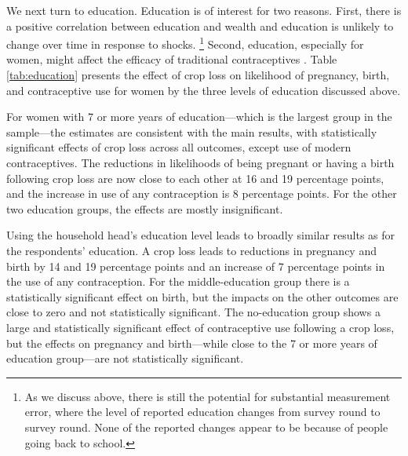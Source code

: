 \documentclass[letterpaper,12pt]{article}
\begin{document}
We next turn to education.
Education is of interest for two reasons.
First, there is a positive correlation between education and wealth and 
education is unlikely to change over time in response to shocks.%
\footnote{
As we discuss above, there is still the potential for substantial
measurement error, where the level of reported education changes
from survey round to survey round.
None of the reported changes appear to be because of people going 
back to school.
}
Second, education, especially for women, might affect the efficacy of 
traditional contraceptives \citep{Rosenzweig1989}.
Table \ref{tab:education} presents the effect of crop loss on
likelihood of pregnancy, birth, and contraceptive use for women
by the three levels of education discussed above.




For women with 7 or more years of education---which is the largest
group in the sample---the estimates are consistent with the 
main results, with statistically significant effects of crop loss 
across all outcomes, except use of modern contraceptives.
The reductions in likelihoods of being pregnant or having a birth
following crop loss are now close to each other at 16 and 19 percentage
points, and the increase in use of any contraception is 8 percentage
points.
For the other two education groups, the effects are mostly insignificant.

Using the household head's education level leads to broadly 
similar results as for the respondents' education. 
A crop loss leads to reductions in pregnancy and birth by
14 and 19 percentage points and an increase of 7 percentage points
in the use of any contraception.
For the middle-education group there is a statistically significant
effect on birth, but the impacts on the other outcomes are close to zero and
not statistically significant.
The no-education group shows a large and statistically significant
effect of contraceptive use following a crop loss, but the
effects on pregnancy and birth---while close to the 7 or more 
years of education group---are not statistically significant.
\end{document}
